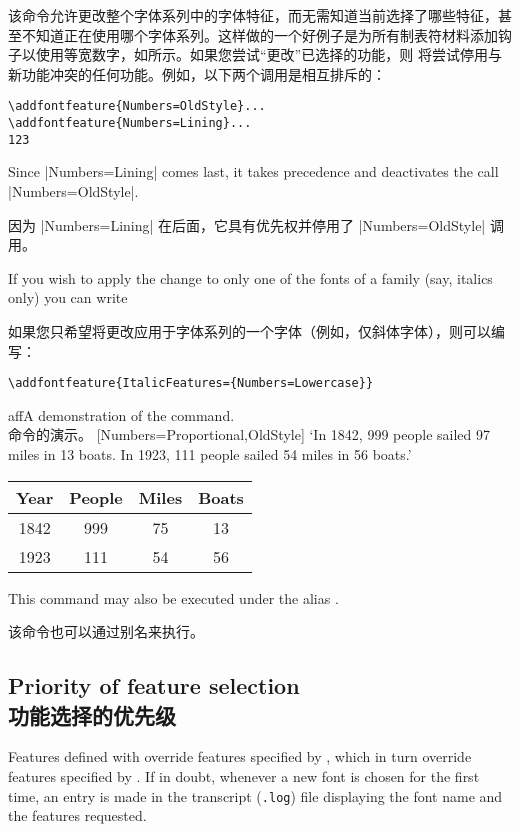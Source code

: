 \documentclass[a4paper]{l3doc}
\begin{document}
该命令允许更改整个字体系列中的字体特征，而无需知道当前选择了哪些特征，甚至不知道正在使用哪个字体系列。这样做的一个好例子是为所有制表符材料添加钩子以使用等宽数字，如所示。如果您尝试“更改”已选择的功能，则  将尝试停用与新功能冲突的任何功能。例如，以下两个调用是相互排斥的：

\begin{Verbatim}
\addfontfeature{Numbers=OldStyle}...
\addfontfeature{Numbers=Lining}...
123
\end{Verbatim}
Since |Numbers=Lining| comes last, it takes precedence and deactivates the call |Numbers=OldStyle|.

因为 |Numbers=Lining| 在后面，它具有优先权并停用了 |Numbers=OldStyle| 调用。

If you wish to apply the change to only one of the fonts of a family (say, italics only)
you can write

如果您只希望将更改应用于字体系列的一个字体（例如，仅斜体字体），则可以编写：

\begin{Verbatim}
\addfontfeature{ItalicFeatures={Numbers=Lowercase}}
\end{Verbatim}


\begin{Lexample}{aff}{A demonstration of the  command.\\ 命令的演示。}
           [Numbers={Proportional,OldStyle}]
  `In 1842, 999 people sailed 97 miles in
   13 boats. In 1923, 111 people sailed 54
   miles in 56 boats.'            \bigskip

  {
  \begin{tabular}{@{} cccc @{}}
            Year & People & Miles & Boats \\
    \hline  1842 &  999   &  75   &  13   \\
            1923 &  111   &  54   &  56
  \end{tabular}}
\end{Lexample}

\DescribeMacro{\addfontfeature}
This command may also be executed under the alias \cmd{\addfontfeature}.

该命令也可以通过别名\cmd{\addfontfeature}来执行。

\subsection{Priority of feature selection\\功能选择的优先级}
Features defined with  override features
specified by , which in turn override features
specified by .  If in doubt, whenever a
new font is chosen for the first time, an entry is made in the
transcript (\texttt{.log}) file displaying the font name and the
features requested.
\end{document}
